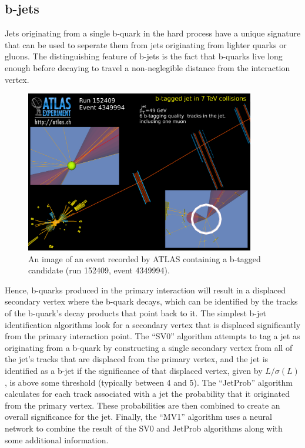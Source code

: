 

\subsection{b-jets}
Jets originating from a single b-quark in the hard process have a unique signature that can be used to seperate them from jets originating from lighter quarks or gluons.
The distinguishing feature of b-jets is the fact that b-quarks live long enough before decaying to travel a non-neglegible distance from the interaction vertex.

\begin{figure}
  \begin{center}
    \includegraphics[width=100mm]{figures/atlas/BTaggedEvent.png}
  \end{center}
  \caption{An image of an event recorded by ATLAS containing a b-tagged candidate (run 152409, event 4349994).}
  \label{img:BTaggedEvent}
\end{figure}

Hence, b-quarks produced in the primary interaction will result in a displaced secondary vertex where the b-quark decays, which can be identified by the tracks of the b-quark's decay products that point back to it.
The simplest b-jet identification algorithms look for a secondary vertex that is displaced significantly from the primary interaction point.
The ``SV0'' algorithm attempts to tag a jet as originating from a b-quark by constructing a single secondary vertex from all of the jet's tracks that are displaced from the primary vertex, and the jet is identified as a b-jet if the significance of that displaced vertex, given by $L/ \sigma(L)$, is above some threshold (typically between 4 and 5).
The ``JetProb'' algorithm calculates for each track associated with a jet the probability that it originated from the primary vertex.
These probabilities are then combined to create an overall significance for the jet.
Finally, the ``MV1'' algorithm uses a neural network to combine the result of the SV0 and JetProb algorithms along with some additional information.


